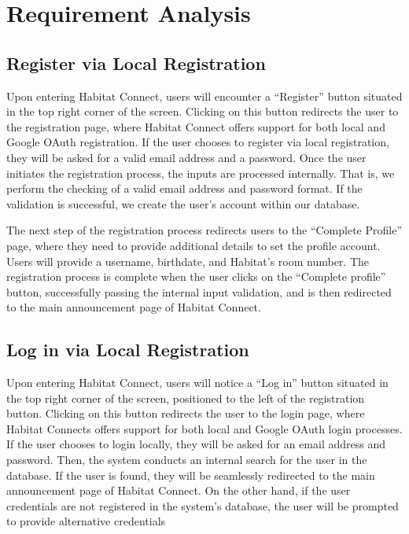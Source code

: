 \documentclass[conference]{IEEEtran}
\begin{document}
\section{Requirement Analysis}
\subsection{Register via Local Registration}
Upon entering Habitat Connect, users will encounter a “Register” button situated in the top right corner of the screen. Clicking on this button redirects the user to the registration page, where Habitat Connect offers support for both local and Google OAuth registration. If the user chooses to register via local registration, they will be asked for a valid email address and a password. Once the user initiates the registration process, the inputs are processed internally. That is, we perform the checking of a valid email address and password format. If the validation is successful, we create the user’s account within our database.

The next step of the registration process redirects users to the “Complete Profile” page, where they need to provide additional details to set the profile account. Users will provide a username, birthdate, and Habitat’s room number. The registration process is complete when the user clicks on the “Complete profile” button, successfully passing the internal input validation, and is then redirected to the main announcement page of Habitat Connect.
\subsection{Log in via Local Registration}
Upon entering Habitat Connect, users will notice a “Log in” button situated in the top right corner of the screen, positioned to the left of the registration button. Clicking on this button redirects the user to the login page, where Habitat Connects offers support for both local and Google OAuth login processes. If the user chooses to login locally, they will be asked for an email address and password. Then, the system conducts an internal search for the user in the database. If the user is found, they will be seamlessly redirected to the main announcement page of Habitat Connect. On the other hand, if the user credentials are not registered in the system’s database, the user will be prompted to provide alternative credentials
\end{document}
